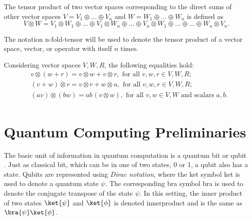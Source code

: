 The tensor product of two vector spaces corresponding to the direct sums of other vector spaces $ V = V_1 \oplus \ldots \oplus V_n$ and  $ W = W_1 \oplus \ldots \oplus W_n$  is defined as 
\begin{equation*}
  V \otimes W = V_1 \otimes W_1 \oplus \ldots \oplus V_1 \otimes W_n  \oplus \ldots \oplus V_n \otimes W_1 \oplus \ldots   \oplus \ldots \oplus W_n \otimes V_n.
\end{equation*}

The notation \gls{n-fold-tensor}  will be used to  denote the tensor product of a vector space, vector, or operator with itself $n$ times.

Considering vector spaces $V, W, R$, the following equalities hold:
\begin{align*}
  & v \otimes (w + r) = v \otimes w + v \otimes r, \text{ for all } v,w,r \in V,W,R; \\
  & (v + w) \otimes r = v \otimes r + w \otimes u, \text{ for all } v,w,r \in V,W,R; \\
  & (a v) \otimes (b w) = ab \hspace{1pt} (v \otimes w), \text{ for all } v,w \in V,W \text{ and scalars } a, b.   \\
\end{align*}











\section{Quantum Computing Preliminaries} \label{sec:Quantum Computing Preliminaries}

The basic unit of information in quantum computation is a quantum bit or qubit \cite{perdrix2008quantum}. Just as classical bit, which can be in one of two states, 0 or 1, a qubit also has a state. Qubits are represented using \emph{Dirac notation},  where the ket symbol \gls{ket} is used to denote a quantum state $\psi$. The corresponding bra symbol \gls{bra} is used to denote the conjugate transpose of the state $\psi$. In this setting, the inner product of two states $\ket{\psi}$ and $\ket{\phi}$ is denoted \gls{innerproduct} and is the same as $\bra{\psi} \ket{\phi}$. %

